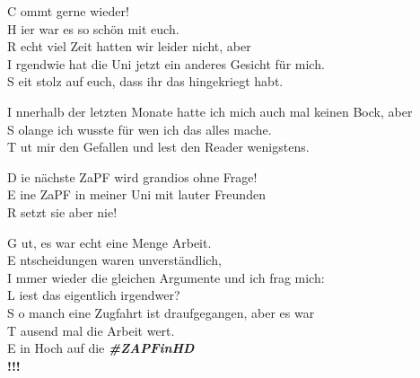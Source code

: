 
\vspace{4cm}

\begin{center}
  C ommt gerne wieder! \\
  H ier war es so schön mit euch. \\
  R echt viel Zeit hatten wir leider nicht, aber \\
  I rgendwie hat die Uni jetzt ein anderes Gesicht für mich. \\
  S eit stolz auf euch, dass ihr das hingekriegt habt.
\begin{center}

\end{center}
  I nnerhalb der letzten Monate hatte ich mich auch mal keinen Bock, aber \\
  S olange ich wusste für wen ich das alles mache. \\
  T ut mir den Gefallen und lest den Reader wenigstens.
\begin{center}

\end{center}
  D ie nächste ZaPF wird grandios ohne Frage! \\
  E ine ZaPF in meiner Uni mit lauter Freunden \\
  R setzt sie aber nie!
\begin{center}

\end{center}
  G ut, es war echt eine Menge Arbeit. \\
  E ntscheidungen waren unverständlich, \\
  I mmer wieder die gleichen Argumente und ich frag mich: \\
  L iest das eigentlich irgendwer? \\
  S o manch eine Zugfahrt ist draufgegangen, aber es war \\
  T ausend mal die Arbeit wert. \\
  E in Hoch auf die \textbf{\textit{\#ZAPFinHD}} \\

  \textbf{!!!}
\end{center}
